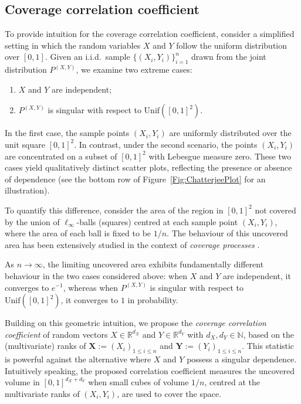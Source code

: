 \documentclass[11pt]{article}
\newcommand{\bs}[1]{\boldsymbol{#1}}
\begin{document}
\subsection{Coverage correlation coefficient}\label{sec:CoveCorrConstruction}
To provide intuition for the coverage correlation coefficient, consider a simplified setting in which the random variables $X$ and $Y$ follow the uniform distribution over $[0, 1]$. Given an i.i.d.\ sample $\{(X_i, Y_i)\}_{i=1}^n$ drawn from the joint distribution $P^{(X, Y)}$, we examine two extreme cases: 
\begin{enumerate}[noitemsep, label=(\roman*)]
    \item $X$ and $Y$ are independent;
    \item $P^{(X,Y)}$ is singular with respect to $\mathrm{Unif}([0, 1]^2)$. 
\end{enumerate}
In the first case, the sample points $(X_i, Y_i)$ are uniformly distributed over the unit square $[0,1]^2$. In contrast, under the second scenario, the points $(X_i, Y_i)$ are concentrated on a subset of $[0,1]^2$ with Lebesgue measure zero. These two cases yield qualitatively distinct scatter plots, reflecting the presence or absence of dependence (see the bottom row of Figure~\ref{Fig:ChatterjeePlot} for an illustration).

To quantify this difference, consider the area of the region in $[0, 1]^2$ not covered by the union of $\ell_\infty$-balls (squares) centred at each sample point $(X_i, Y_i)$, where the area of each ball is fixed to be $1/n$. The behaviour of this uncovered area has been extensively studied in the context of \emph{coverage processes} \citep[see, e.g.][]{hall1988introduction}. 

As $n \to \infty$, the limiting uncovered area exhibits fundamentally different behaviour in the two cases considered above: when $X$ and $Y$ are independent, it converges to $e^{-1}$, whereas when $P^{(X,Y)}$ is singular with respect to $\mathrm{Unif}([0,1]^2)$, it converges to $1$ in probability.

Building on this geometric intuition, we propose the \emph{coverage correlation coefficient} of random vectors $X \in \mathbb{R}^{d_X}$ and $Y \in \mathbb{R}^{d_Y}$ with $d_X, d_Y \in \mathbb{N}$, based on the (multivariate) ranks of $\bs X := (X_i)_{1\leq i\leq n}$ and $\bs Y := (Y_i)_{1\leq i\leq n}$. This statistic is powerful against the alternative where $X$ and $Y$ possess a singular dependence. Intuitively speaking, the proposed correlation coefficient measures the uncovered volume in $[0, 1]^{d_X + d_Y}$ when small cubes of volume $1/n$, centred at the multivariate ranks of $(X_i, Y_i)$, are used to cover the space. 
\end{document}

